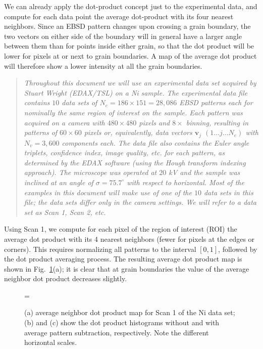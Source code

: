 \documentclass[DIV=calc, paper=letter, fontsize=11pt]{scrartcl}	 %
\begin{document}
We can already apply the dot-product concept just to the experimental data, and compute for each data point the average dot-product with 
its four nearest neighbors.  Since an EBSD pattern changes upon crossing a grain boundary, the two vectors on either side of the boundary will in general
have a larger angle between them than for points inside either grain, so that the dot product will be lower for pixels at or next to grain
boundaries.  A map of the average dot product will therefore show a lower intensity at all the grain boundaries.  

\begin{verse}
\textit{Throughout this document we will use an experimental data set acquired by Stuart Wright (EDAX/TSL) on a Ni sample.  The experimental data
file contains $10$ data sets of $N_e=186\times 151 = 28,086$ EBSD patterns each for nominally the same region of interest on the sample.  Each 
pattern was acquired on a camera with $480\times 480$ pixels and $8\times$ binning, resulting in patterns of $60\times 60$ pixels or, equivalently,
data vectors $\mathbf{v}_j$ $(1\ldots j\ldots N_e)$ with $N_v=3,600$ components each.  The data file also contains the Euler angle triplets, 
confidence index, image quality, etc. for each pattern, as determined by the EDAX software (using the Hough transform indexing approach).
The microscope was operated at $20$ kV and the sample was inclined at an angle of $\sigma=75.7^{\circ}$ with respect to horizontal.
Most of the examples in this document will make use of one of the $10$ data sets in this file; the data sets differ only in the camera settings.
We will refer to a data set as \textsf{Scan 1}, \textsf{Scan 2}, etc.}
\end{verse}

Using \textsf{Scan 1}, we compute for each pixel of the region of interest (ROI) the average dot product with its 4 nearest neighbors (fewer for pixels
at the edges or corners).  This requires normalizing all patterns to the interval $[0,1]$, followed by the dot product averaging process.  The resulting average
dot product map is shown in Fig.~\ref{fig:dp1}(a); it is clear that at grain boundaries the value of the average neighbor dot product decreases slightly.

\begin{figure}[h]
\centering\leavevmode
\epsfxsize=\textwidth{}
\caption{\label{fig:dp1} (a) average neighbor dot product map for \textsf{Scan 1} of the Ni data set; (b) and (c) show the dot product histograms without
and with average pattern subtraction, respectively.  Note the different horizontal scales.}
\end{figure}
\end{document}
